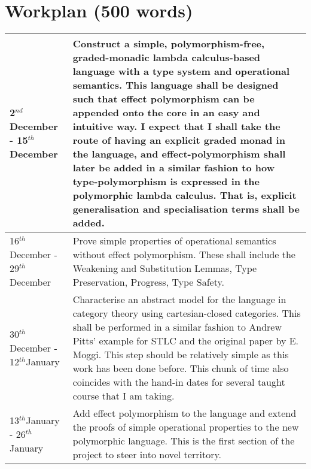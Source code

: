 \documentclass[11pt]{article}
\renewcommand{\th}{$^{th}$}
\newcommand{\nd}{$^{nd}$}
\begin{document}
\section{Workplan (500 words)}

\begin{tabular}{|p{6cm}||p{10cm}|}
\hline
	2\nd December - 15\th December & Construct a simple, polymorphism-free, graded-monadic lambda calculus-based language with a type system and operational semantics. This language shall be designed such that effect polymorphism can be appended onto the core in an easy and intuitive way. I expect that I shall take the route of having an explicit graded monad in the language, and effect-polymorphism shall later be added in a similar fashion to how type-polymorphism is expressed in the polymorphic lambda calculus. That is, explicit generalisation and specialisation terms shall be added. \\\hline
	16\th December - 29\th December & Prove simple properties of operational semantics without effect polymorphism. These shall include the Weakening and Substitution Lemmas, Type Preservation, Progress, Type Safety.\\\hline
	30\th December - 12\th January & Characterise an abstract model for the language in category theory using cartesian-closed categories. This shall be performed in a similar fashion to Andrew Pitts' example for STLC and the original paper by E. Moggi. This step should be relatively simple as this work has been done before. This chunk of time also coincides with the hand-in dates for several taught course that I am taking.  \\\hline
	13\th January - 26\th January &  Add effect polymorphism to the language and extend the proofs of simple operational properties to the new polymorphic language. This is the first section of the project to steer into novel territory. \\\hline
	

\end{tabular}
\end{document}
